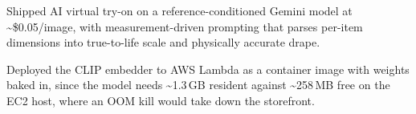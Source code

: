 \documentclass[letterpaper,10pt]{article}
\newcommand{\nk}{\kern0pt}
\newcommand{\resumeItem}[1]{
  \item\small{
    {#1 \vspace{-3pt}}
  }
}
\begin{document}
        \resumeItem{Shipped AI virtual try-on on a reference-conditioned Gemini model at \textasciitilde\$0.05/image, with measurement-driven prompting that parses per-item dimensions into true-to-life scale and physically accurate drape.}
        \resumeItem{Deployed the CLIP embedder to A\nk WS Lambda as a container image with weights baked in, since the model needs \textasciitilde1.3\,GB resident against \textasciitilde258\,MB free on the EC2 host, where an OOM kill would take down the storefront.}
\end{document}
